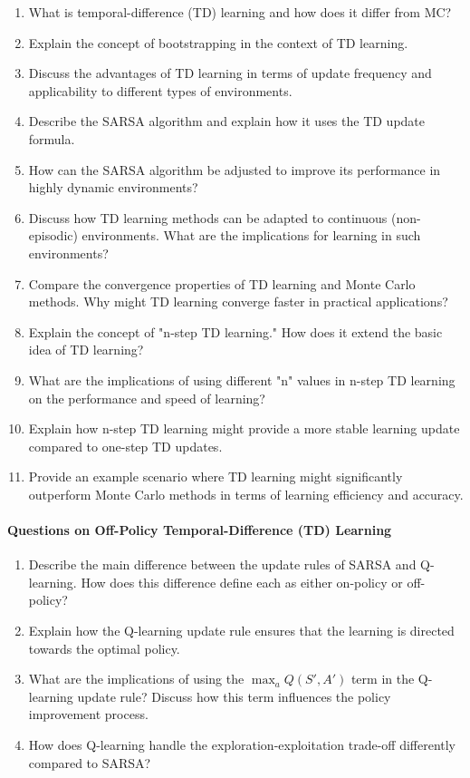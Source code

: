\begin{enumerate}
\item What is temporal-difference (TD) learning and how does it differ from MC?
\item Explain the concept of bootstrapping in the context of TD learning.
\item Discuss the advantages of TD learning in terms of update frequency and applicability to different types of environments.
\item Describe the SARSA algorithm and explain how it uses the TD update formula.
\item How can the SARSA algorithm be adjusted to improve its performance in highly dynamic environments?
\item Discuss how TD learning methods can be adapted to continuous (non-episodic) environments. What are the implications for learning in such environments?
\item Compare the convergence properties of TD learning and Monte Carlo methods. Why might TD learning converge faster in practical applications?
\item Explain the concept of "n-step TD learning." How does it extend the basic idea of TD learning?
\item What are the implications of using different "n" values in n-step TD learning on the performance and speed of learning?
\item Explain how n-step TD learning might provide a more stable learning update compared to one-step TD updates.
\item Provide an example scenario where TD learning might significantly outperform Monte Carlo methods in terms of learning efficiency and accuracy.
\end{enumerate}

\paragraph*{Questions on Off-Policy Temporal-Difference (TD) Learning}

\begin{enumerate}
\item Describe the main difference between the update rules of SARSA and Q-learning. How does this difference define each as either on-policy or off-policy?
\item Explain how the Q-learning update rule ensures that the learning is directed towards the optimal policy.
\item What are the implications of using the $\operatorname*{max}_a Q(S', A')$ term in the Q-learning update rule? Discuss how this term influences the policy improvement process.
\item How does Q-learning handle the exploration-exploitation trade-off differently compared to SARSA?
\end{enumerate}
